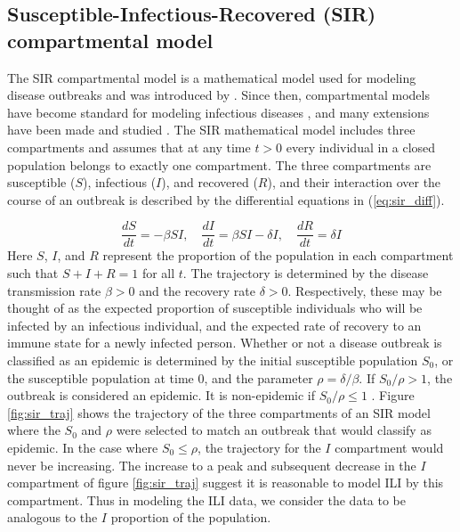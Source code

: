 \documentclass[ba]{imsart}
\theoremstyle{plain}
\theoremstyle{definition}
\theoremstyle{remark}
\begin{document}
\subsection{Susceptible-Infectious-Recovered (SIR) compartmental model} \label{sec:sir_func}

The SIR compartmental model is a mathematical model used for modeling disease outbreaks and was introduced by \cite{kermack1927contribution}. Since then, compartmental models have become standard for modeling infectious diseases \cite[]{allen2008mathematical}, and many extensions have been made and studied \cite[for example]{simon2020sir, allen2017primer, van2008deterministic}. The SIR mathematical model includes three compartments and assumes that at any time $t>0$ every individual in a closed population belongs to exactly one compartment. The three compartments are susceptible ($S$), infectious ($I$), and recovered ($R$), and their interaction over the course of an outbreak is described by the differential equations in (\ref{eq:sir_diff}).    

\begin{equation}
    \label{eq:sir_diff}
    \frac{dS}{dt} = -\beta SI, \quad \frac{dI}{dt} = \beta S I - \delta I, \quad \frac{dR}{dt} = \delta I
\end{equation}
Here $S$, $I$, and $R$ represent the proportion of the population in each compartment such that $S + I + R = 1$ for all $t$. The trajectory is determined by the disease transmission rate $\beta > 0$ and the recovery rate $\delta > 0$. Respectively, these may be thought of as the expected proportion of susceptible individuals who will be infected by an infectious individual, and the expected rate of recovery to an immune state for a newly infected person. Whether or not a disease outbreak is classified as an epidemic is determined by the initial susceptible population $S_0$, or the susceptible population at time $0$, and the parameter $\rho = \delta/
\beta$. If $S_0/\rho > 1$, the outbreak is considered an epidemic. It is non-epidemic if $S_0/\rho \leq 1$ \cite[]{osthus2019dynamic}. Figure \ref{fig:sir_traj} shows the trajectory of the three compartments of an SIR model where the $S_0$ and $\rho$ were selected to match an outbreak that would classify as epidemic. In the case where $S_0 \leq \rho$, the trajectory for the $I$ compartment would never be increasing. The increase to a peak and subsequent decrease in the $I$ compartment of figure \ref{fig:sir_traj} suggest it is reasonable to model ILI by this compartment. Thus in modeling the ILI data, we consider the data to be analogous to the $I$ proportion of the population.
\end{document}
